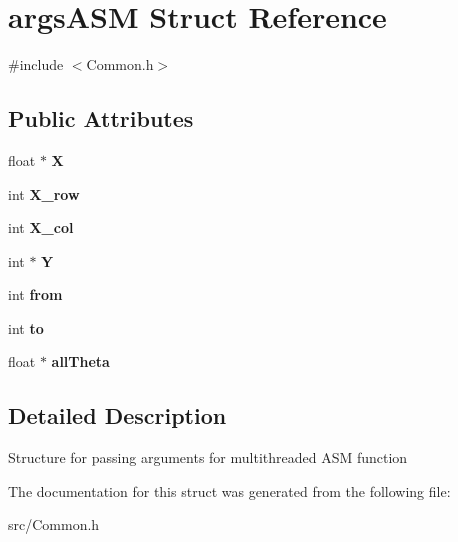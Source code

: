 \hypertarget{structargs_a_s_m}{\section{args\-A\-S\-M Struct Reference}
\label{structargs_a_s_m}
}


{\ttfamily \#include $<$Common.\-h$>$}

\subsection*{Public Attributes}
\begin{DoxyCompactItemize}
\item 
\hypertarget{structargs_a_s_m_a429916dcce2c029eacc26ce554b64be1}{float $\ast$ {\bfseries X}}\label{structargs_a_s_m_a429916dcce2c029eacc26ce554b64be1}

\item 
\hypertarget{structargs_a_s_m_adbff7f49646817bb1a5536e441074d64}{int {\bfseries X\-\_\-row}}\label{structargs_a_s_m_adbff7f49646817bb1a5536e441074d64}

\item 
\hypertarget{structargs_a_s_m_a6a1cc2d43b8e2f4339c0857f52ff0f31}{int {\bfseries X\-\_\-col}}\label{structargs_a_s_m_a6a1cc2d43b8e2f4339c0857f52ff0f31}

\item 
\hypertarget{structargs_a_s_m_af3cb288b0f5727e2abe3a1b942cb0578}{int $\ast$ {\bfseries Y}}\label{structargs_a_s_m_af3cb288b0f5727e2abe3a1b942cb0578}

\item 
\hypertarget{structargs_a_s_m_a368526cbead6016daf17febb0433861d}{int {\bfseries from}}\label{structargs_a_s_m_a368526cbead6016daf17febb0433861d}

\item 
\hypertarget{structargs_a_s_m_afa4f5876c50c4c361439d372c1cb25db}{int {\bfseries to}}\label{structargs_a_s_m_afa4f5876c50c4c361439d372c1cb25db}

\item 
\hypertarget{structargs_a_s_m_a19e1c2e1f46eaef633003650f9548e33}{float $\ast$ {\bfseries all\-Theta}}\label{structargs_a_s_m_a19e1c2e1f46eaef633003650f9548e33}

\end{DoxyCompactItemize}


\subsection{Detailed Description}
Structure for passing arguments for multithreaded A\-S\-M function 

The documentation for this struct was generated from the following file\-:\begin{DoxyCompactItemize}
\item 
src/Common.\-h\end{DoxyCompactItemize}
